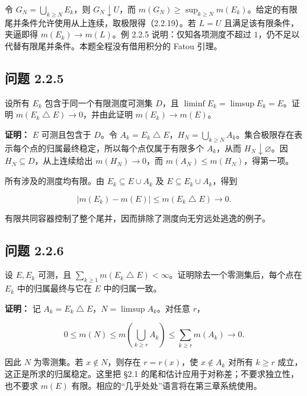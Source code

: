 \documentclass[11pt,a4paper]{article}
\begin{document}
令 \(G_N=\bigcup_{k\ge N}E_k\)，则 \(G_N\downarrow U\)，而
\(m(G_N)\ge\sup_{k\ge N}m(E_k)\)。给定的有限尾并条件允许使用从上连续，取极限得（2.2.19）。若
\(L=U\) 且满足该有限条件，夹逼即得 \(m(E_k)\to m(L)\)。例 2.2.5
说明：仅知各项测度不超过
\(1\)，仍不足以代替有限尾并条件。本题全程没有借用积分的 Fatou 引理。

\subsection{问题 2.2.5}\label{ux95eeux9898-2.2.5}

设所有 \(E_k\) 包含于同一个有限测度可测集 \(D\)，且
\(\liminf E_k=\limsup E_k=E\)。证明
\(m(E_k\mathbin{\triangle}E)\to0\)，并由此证明 \(m(E_k)\to m(E)\)。

\textbf{证明：} \(E\) 可测且包含于 \(D\)。令
\(A_k=E_k\mathbin{\triangle}E\)，\(H_N=\bigcup_{k\ge N}A_k\)。集合极限存在表示每个点的归属最终稳定，所以每个点仅属于有限多个
\(A_k\)，从而 \(H_N\downarrow\varnothing\)。因
\(H_N\subseteq D\)，从上连续给出 \(m(H_N)\to0\)，而
\(m(A_N)\le m(H_N)\)，得第一项。

所有涉及的测度均有限。由 \(E_k\subseteq E\cup A_k\) 及
\(E\subseteq E_k\cup A_k\)，得到

\begin{equation*}
|m(E_k)-m(E)|\le m(E_k\mathbin{\triangle}E)\longrightarrow0.
\tag{2.2.20}
\end{equation*}

有限共同容器控制了整个尾并，因而排除了测度向无穷远处逃逸的例子。

\subsection{问题 2.2.6}\label{ux95eeux9898-2.2.6}

设 \(E,E_k\) 可测，且
\(\sum_{k\ge1}m(E_k\mathbin{\triangle}E)<\infty\)。证明除去一个零测集后，每个点在
\(E_k\) 中的归属最终与它在 \(E\) 中的归属一致。

\textbf{证明：} 记
\(A_k=E_k\mathbin{\triangle}E\)，\(N=\limsup A_k\)。对任意 \(r\)，

\begin{equation*}
0\le m(N)\le m\left(\bigcup_{k\ge r}A_k\right)
\le\sum_{k\ge r}m(A_k)\longrightarrow0.
\tag{2.2.21}
\end{equation*}

因此 \(N\) 为零测集。若 \(x\notin N\)，则存在 \(r=r(x)\)，使
\(x\notin A_k\) 对所有 \(k\ge r\) 成立，这正是所求的归属稳定。这里把
§2.1 的尾和估计应用于对称差；不要求独立性，也不要求 \(m(E)\)
有限。相应的``几乎处处''语言将在第三章系统使用。
\end{document}
